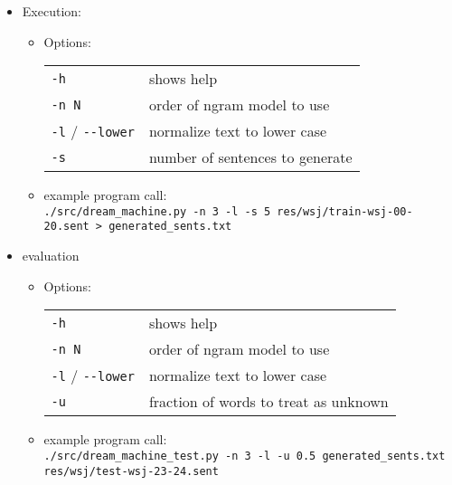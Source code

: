 \documentclass[a0,boxedsections,landscape]{sciposter}
\begin{document}
\begin{multicols}{3}
\begin{itemize}
   \item Execution:
    \begin{itemize}
        \item Options:\\[.5ex]
        \begin{listliketab}
            \begin{tabular}{ll}
                \verb+-h+ & shows help \\
                \verb+-n N+ & order of ngram model to use \\
                \verb+-l+ / \verb+--lower+ & normalize text to lower case \\
                \verb+-s+ & number of sentences to generate \\
            \end{tabular}
        \end{listliketab}
        \item example program call: \\
            \verb+./src/dream_machine.py -n 3 -l -s 5 res/wsj/train-wsj-00-20.sent > generated_sents.txt+
        
    \end{itemize}
    
    \item evaluation
    
    \begin{itemize}
        \item Options:
        \begin{listliketab}
            \begin{tabular}{ll}
                \verb+-h+ & shows help \\
                \verb+-n N+ & order of ngram model to use \\
                \verb+-l+ / \verb+--lower+ & normalize text to lower case \\
                \verb+-u+ & fraction of words to treat as unknown \\
            \end{tabular}
        \end{listliketab}
        \item example program call: \\
            \verb+./src/dream_machine_test.py -n 3 -l -u 0.5 generated_sents.txt res/wsj/test-wsj-23-24.sent+
    \end{itemize}
    
\end{itemize}


\end{multicols}
\end{document}
